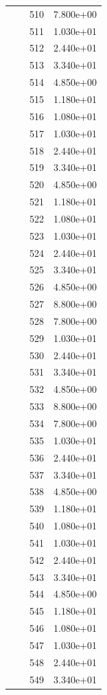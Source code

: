 \documentclass[12pt]{article}
\begin{document}
\begin{longtable}{@{}cccc@{}}
 &  & 510 & 7.800e+00 \\
 &  & 511 & 1.030e+01 \\
 &  & 512 & 2.440e+01 \\
 &  & 513 & 3.340e+01 \\
 &  & 514 & 4.850e+00 \\
 &  & 515 & 1.180e+01 \\
 &  & 516 & 1.080e+01 \\
 &  & 517 & 1.030e+01 \\
 &  & 518 & 2.440e+01 \\
 &  & 519 & 3.340e+01 \\
 &  & 520 & 4.850e+00 \\
 &  & 521 & 1.180e+01 \\
 &  & 522 & 1.080e+01 \\
 &  & 523 & 1.030e+01 \\
 &  & 524 & 2.440e+01 \\
 &  & 525 & 3.340e+01 \\
 &  & 526 & 4.850e+00 \\
 &  & 527 & 8.800e+00 \\
 &  & 528 & 7.800e+00 \\
 &  & 529 & 1.030e+01 \\
 &  & 530 & 2.440e+01 \\
 &  & 531 & 3.340e+01 \\
 &  & 532 & 4.850e+00 \\
 &  & 533 & 8.800e+00 \\
 &  & 534 & 7.800e+00 \\
 &  & 535 & 1.030e+01 \\
 &  & 536 & 2.440e+01 \\
 &  & 537 & 3.340e+01 \\
 &  & 538 & 4.850e+00 \\
 &  & 539 & 1.180e+01 \\
 &  & 540 & 1.080e+01 \\
 &  & 541 & 1.030e+01 \\
 &  & 542 & 2.440e+01 \\
 &  & 543 & 3.340e+01 \\
 &  & 544 & 4.850e+00 \\
 &  & 545 & 1.180e+01 \\
 &  & 546 & 1.080e+01 \\
 &  & 547 & 1.030e+01 \\
 &  & 548 & 2.440e+01 \\
 &  & 549 & 3.340e+01 \\

\end{longtable}
\end{document}
